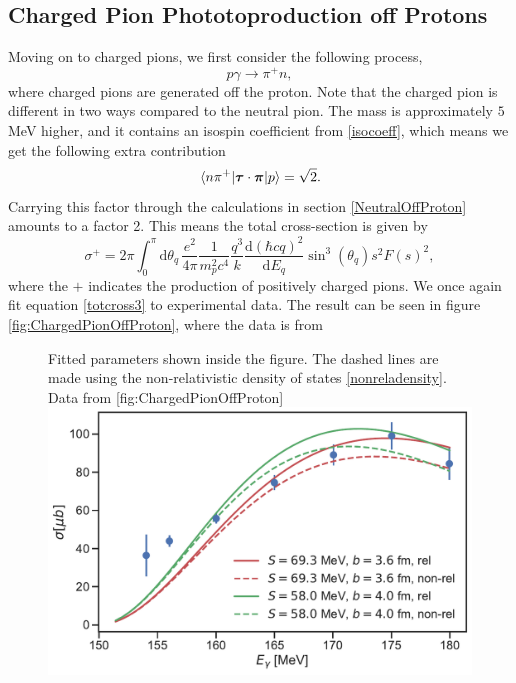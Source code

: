 \subsection{Charged Pion Phototoproduction off Protons}\label{sec:CoffP}
Moving on to charged pions, we first consider the following process,
\begin{equation} \label{charged1}
	p\gamma \rightarrow \pi^+ n,
\end{equation}
where charged pions are generated off the proton. Note that the charged pion is different in two ways compared to the neutral pion. The mass is approximately $5$ MeV higher, and it contains an isospin coefficient from \eqref{isocoeff}, which means we get the following extra contribution
\begin{equation} \label{isofactorcharged}
	\mel*{n\pi^+}{\bm{\mathrm{\tau}}\cdot\bm{\mathrm{\pi}}}{p} = \sqrt{2}.
\end{equation}
Carrying this factor through the calculations in section \ref{NeutralOffProton} amounts to a factor 2. This means the total cross-section is given by
\begin{equation} \label{totcross3}
	\sigma^+ =  2\pi \int_0^\pi \text{d}\theta_q \, \frac{e^2}{4\pi}\frac{1}{m_p^2c^4}\frac{q^3}{k}\frac{\text{d}(\hbar c q)^2}{\text{d}E_q}\sin^3(\theta_q) s^2 F(s)^2,
\end{equation}
where the $+$ indicates the production of positively charged pions. We once again fit equation \eqref{totcross3} to experimental data. The result can be seen in figure \ref{fig:ChargedPionOffProton}, where the data is from 
\begin{figure}[H]
	\begin{sidecaption}{Fitted parameters shown inside the figure. The dashed lines are made using the non-relativistic density of states \eqref{nonreladensity}. Data from \cite{PionOffNeutron2}}[fig:ChargedPionOffProton]
		\includegraphics[width=\linewidth]{Figures/ChargedPionOffProtonExact.pdf}
	\end{sidecaption}
\end{figure}
